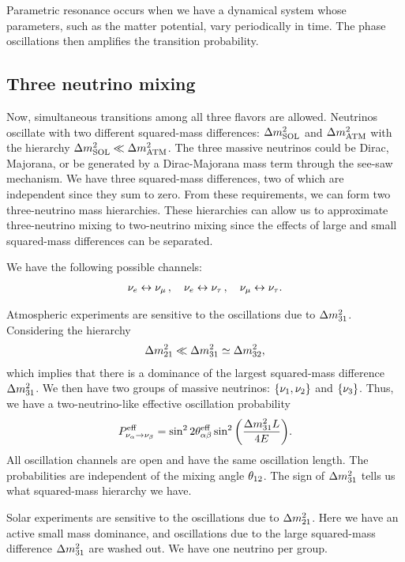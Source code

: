 \documentclass[twocolumn]{article}
\begin{document}
Parametric resonance occurs when we have a dynamical system whose parameters, such as the matter potential, vary periodically in time. The phase oscillations then amplifies the transition probability.

\subsection*{Three neutrino mixing}
Now, simultaneous transitions among all three flavors are allowed.
Neutrinos oscillate with two different squared-mass differences: $\dm[SOL]$ and $\dm[ATM]$ with the hierarchy $\dm[SOL] \ll \dm[ATM]$. The three massive neutrinos could be Dirac, Majorana, or be generated by a Dirac-Majorana mass term through the see-saw mechanism. We have three squared-mass differences, two of which are independent since they sum to zero. From these requirements, we can form two three-neutrino mass hierarchies. These hierarchies can allow us to approximate three-neutrino mixing to two-neutrino mixing since the effects of large and small squared-mass differences can be separated.

We have the following possible channels:
\begin{align*}
  \nu_e \leftrightarrow \nu_\mu\,, \quad \nu_e \leftrightarrow \nu_\tau\,, \quad \nu_\mu \leftrightarrow \nu_\tau
.\end{align*}

Atmospheric experiments are sensitive to the oscillations due to $\dm[31]$. Considering the hierarchy
\begin{align*}
  \dm[21] \ll \dm[31] \simeq \dm[32]
,\end{align*}
which implies that there is a dominance of the largest squared-mass difference $\dm[31]$. We then have two groups of massive neutrinos: $\{\nu_{\text{{1}}}, \nu_{\text{{2}}}\}$ and $\{\nu_{\text{{3}}}\}$. Thus, we have a two-neutrino-like effective oscillation probability
\begin{align*}
  P^\t{eff}_{\na \to \nb} = \sin^2{2 \th^\t{eff}_{\a\b}} \sin^2{\left( \frac{\dm[31]L}{4E} \right)}
.\end{align*}
All oscillation channels are open and have the same oscillation length. The probabilities are independent of the mixing angle $\th[12]$. The sign of $\dm[31]$ tells us what squared-mass hierarchy we have. 

Solar experiments are sensitive to the oscillations due to $\dm[21]$. Here we have an active small mass dominance, and oscillations due to the large squared-mass difference $\dm[31]$ are washed out. We have one neutrino per group.
\end{document}
